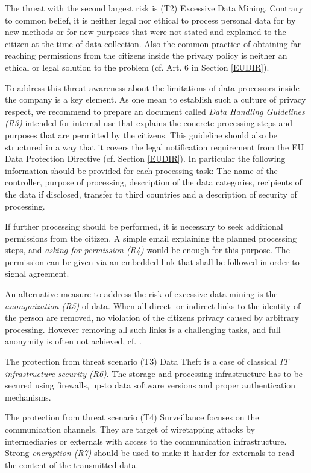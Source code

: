 The threat with the second largest risk is (T2) Excessive Data Mining.
Contrary to common belief, it is neither legal nor ethical to process
personal data for by new methods or for new purposes that were not
stated and explained to the citizen at the time of data
collection. Also the common practice of obtaining far-reaching
permissions from the citizens inside the privacy policy is neither an
ethical or legal solution to the problem (cf. Art. 6 in Section
\ref{EUDIR}).

To address this threat awareness about the limitations of data
processors inside the company is a key element. As one mean to
establish such a culture of privacy respect, we recommend to prepare
an document called \emph{Data Handling Guidelines (R3)} intended for
internal use that explains the concrete processing steps and purposes
that are permitted by the citizens. This guideline should also be
structured in a way that it covers the legal notification requirement
from the EU Data Protection Directive (cf. Section \ref{EUDIR}). In
particular the following information should be provided for each
processing task: The name of the controller, purpose of processing,
description of the data categories, recipients of the data if
disclosed, transfer to third countries and a description of security
of processing.

If further processing should be performed, it is necessary to seek
additional permissions from the citizen. A simple email explaining the
planned processing steps, and \emph{asking for permission (R4)} would be
enough for this purpose. The permission can be given via an embedded
link that shall be followed in order to signal agreement.

An alternative measure to address the risk of excessive data mining is
the \emph{anonymization (R5)} of data. When all direct- or indirect
links to the identity of the person are removed, no violation of the
citizens privacy caused by arbitrary processing. However removing all
such links is a challenging tasks, and full anonymity is often not
achieved, cf. \cite{krumm2009}.

The protection from threat scenario (T3) Data Theft is a case of
classical \emph{IT infrastructure security (R6)}. The storage and processing infrastructure has
to be secured using firewalls, up-to data software versions and proper
authentication mechanisms.

The protection from threat scenario (T4) Surveillance focuses on the
communication channels. They are target of wiretapping attacks by
intermediaries or externals with access to the communication
infrastructure. Strong \emph{encryption (R7)} should be used to make
it harder for externals to read the content of the transmitted data.


